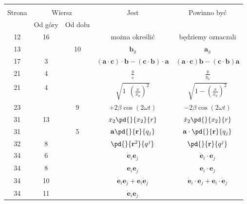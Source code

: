 \documentclass[a4paper,11pt]{article}
\begin{document}
\begin{center}
  \begin{tabular}{|c|c|c|c|c|}
    \hline
    & \multicolumn{2}{c|}{} & & \\
    Strona & \multicolumn{2}{c|}{Wiersz} & Jest
                              & Powinno być \\ \cline{2-3}
    & Od góry & Od dołu & & \\
    \hline
    12  & 16 & & można określić & będziemy oznaczali \\
    13  & & 10 & $\mathbf{ b }_{ y }$ & $\mathbf{ a }_{ y }$ \\
    17  &  3 & & $(\mathbf{ a } \cdot \mathbf{ c } ) \cdot \mathbf{ b }
                 - ( \mathbf{ c } \cdot \mathbf{ b } ) \cdot \mathbf{ a }$
           & $(\mathbf{ a } \cdot \mathbf{ c } ) \mathbf{ b }
             - ( \mathbf{ c } \cdot \mathbf{ b } ) \mathbf{ a }$ \\
    21  &  4 & & $\frac{ y }{ { }_{ 0 } }$ & $\frac{ y }{ { y }_{ 0 } }$ \\
    21  &  4 & & $\sqrt{ 1 \:\: \left( \frac{ x }{ x_{ 0 } }
                 \right)^{ 2 } } $
           & $\sqrt{ 1 - \left( \frac{ x }{ x_{ 0 } } \right)^{ 2 } } $ \\
    23  & &  9 & $+2\beta \cos( 2\omega t )$ & $-2\beta
                                               \cos( 2\omega t )$ \\
    31  & 13 & & $x_{ 2 } \pd{}{ x_{ 2 } }{ r }$
           & $\dot{ x }_{ 2 } \pd{}{ x_{ 2 } }{ r }$ \\
    31  & &  5 & $\mathbf{ a } \pd{}{ \mathbf{ r } }{ q_{ j } }$
           & $\mathbf{ a } \cdot \pd{}{ \mathbf{ r } }{ q_{ j } }$ \\
    32  &  8 & & $\pd{}{ { \mathbf{ r }^{ 2 } } }{ { q^{ j } } }$
           & $\pd{}{ \mathbf{ r } }{ { q^{ j } } }$ \\
    34  &  6 & & $\dot{ \mathbf{ e } }_{ i } \mathbf{ e }_{ j }$
           & $\dot{ \mathbf{ e } }_{ i } \cdot \mathbf{ e }_{ j }$ \\
    34  &  8 & & $\mathbf{ e }_{ i } \mathbf{ e }_{ j }$
           & $\mathbf{ e }_{ i } \cdot \mathbf{ e }_{ j }$ \\
    34  & 10 & & $\dot{ \mathbf{ e } }_{ i } \mathbf{ e }_{ j }
                 + \mathbf{ e }_{ i } \dot{ \mathbf{ e } }_{ j }$
           & $\dot{ \mathbf{ e } }_{ i } \cdot \mathbf{ e }_{ j }
             + \mathbf{ e }_{ i } \cdot \dot{ \mathbf{ e } }_{ j }$ \\
    34  & 11 & & $\dot{ \mathbf{ e } }_{ i } \mathbf{ e }_{ j }$

\end{tabular}
\end{center}
\end{document}
